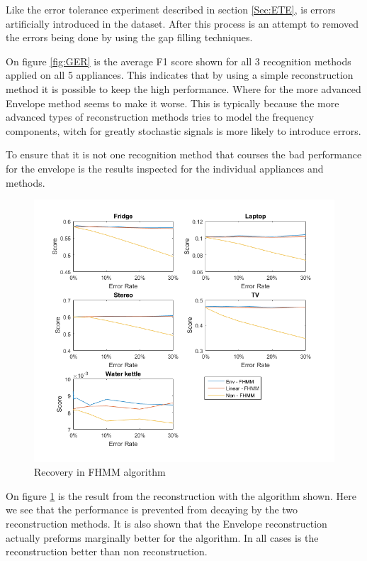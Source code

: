 Like the error tolerance experiment described in section \ref{Sec:ETE}, is errors artificially introduced in the dataset. After this process is an attempt to removed the errors being done by using the gap filling techniques. 

On figure \ref{fig:GER} is the average F1 score shown for all 3 recognition methods applied on all 5 appliances. This indicates that by using a simple reconstruction method it is possible to keep the high performance. Where for the more advanced Envelope method seems to make it worse. This is typically because the more advanced types of reconstruction methods tries to model the frequency components, witch for greatly stochastic signals is more likely to introduce errors. 

To ensure that it is not one recognition method that courses the bad performance for the envelope is the results inspected for the individual appliances and methods. 


\newpage

\begin{figure}[H]
\centering
\includegraphics[width=1\textwidth]{billeder/Rec-FHMM.png}
\caption{Recovery in FHMM algorithm}
\label{fig:ERFHMM}
\end{figure}

On figure \ref{fig:ERFHMM} is the result from the reconstruction with the  algorithm shown. Here we see that the performance is prevented from decaying by the two reconstruction methods. It is also shown that the Envelope reconstruction actually preforms marginally better for the  algorithm. In all cases is the reconstruction better than non reconstruction. 

